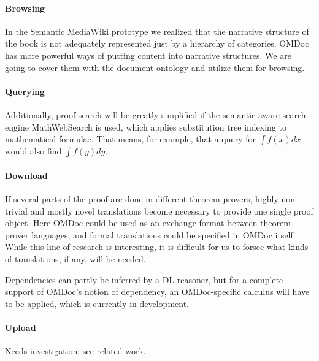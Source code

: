 \paragraph{Browsing} In the Semantic MediaWiki prototype we realized that the
narrative structure of the book is not adequately represented just by a
hierarchy of categories.  OMDoc has more powerful ways of putting content into
narrative structures\cite{KohMueMue:dfncimk07}.  We are going to cover them with
the document ontology and utilize them for browsing.

\paragraph{Querying} Additionally, proof search will be greatly simplified if
the semantic-aware search engine MathWebSearch\cite{KohSuc:asemf06} is used,
which applies substitution tree indexing to mathematical formulae.  That means,
for example, that a query for $\int f(x) dx$ would also find $\int f(y) dy$.

\paragraph{Download} If several parts of the proof are done in different
theorem provers, highly non-trivial and mostly novel translations become
necessary to provide one single proof object. Here OMDoc could be used as an
exchange format between theorem prover languages, and formal translations could
be specified in OMDoc itself.  While this line of research is interesting, it is
difficult for us to forsee what kinds of translations, if any, will be needed.

Dependencies can partly be inferred by a DL reasoner, but for a complete support
of OMDoc's notion of dependency, an OMDoc-specific calculus will have to be
applied, which is currently in development.

\paragraph{Upload} Needs investigation; see related work.

